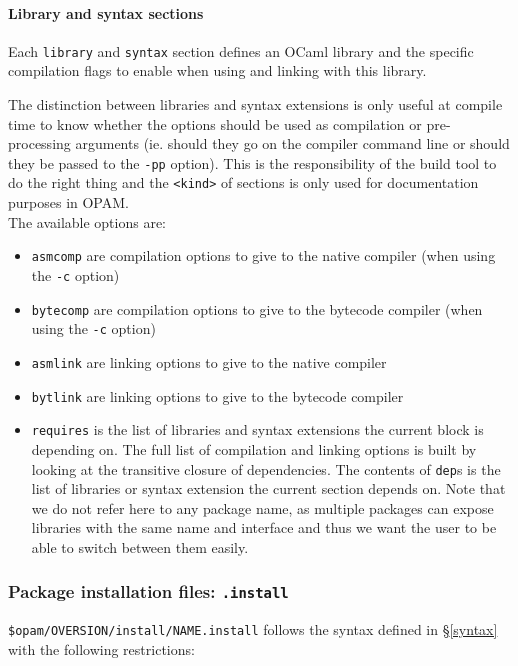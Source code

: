 \documentclass[a4paper,11pt]{article}
\begin{document}
\paragraph{Library and syntax sections}

Each {\tt library} and {\tt syntax} section defines an OCaml library
and the specific compilation flags to enable when using and linking
with this library.

The distinction between libraries and syntax extensions is only useful
at compile time to know whether the options should be used as
compilation or pre-processing arguments (ie. should they go on the
compiler command line or should they be passed to the {\tt -pp}
option). This is the responsibility of the build tool to do the right
thing and the {\tt <kind>} of sections is only used for documentation
purposes in OPAM. \\

The available options are:

\begin{itemize}
\item {\tt asmcomp} are compilation options to give to the native
  compiler (when using the {\tt -c} option)
\item {\tt bytecomp} are compilation options to give to the bytecode
  compiler (when using the {\tt -c} option)
\item {\tt asmlink} are linking options to give to the native compiler 
\item {\tt bytlink} are linking options to give to the bytecode
  compiler
\item {\tt requires} is the list of libraries and syntax extensions
  the current block is depending on. The full list of compilation
  and linking options is built by looking at the transitive closure of
  dependencies. The contents of {\tt dep}s is the list of libraries or
  syntax extension the current section depends on. Note that we do not
  refer here to any package name, as multiple packages can expose libraries
  with the same name and interface and thus we want the user to be able
  to switch between them easily.
\end{itemize}

\subsubsection{Package installation files: {\tt .install}}
\label{dotinstall}

\verb+$opam/OVERSION/install/NAME.install+ follows the syntax defined
in \S\ref{syntax} with the following restrictions:
\end{document}
